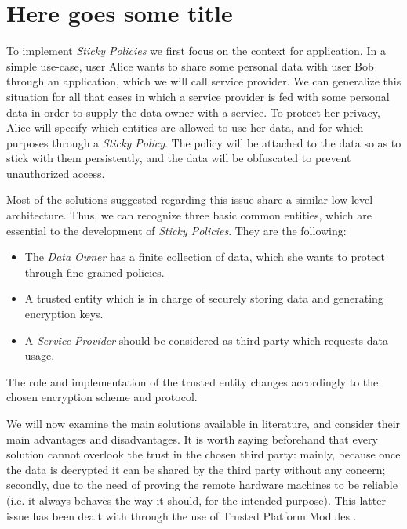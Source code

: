 \chapter{Here goes some title}
\label{chapter2}
\thispagestyle{empty}

To implement \textit{Sticky Policies} we first focus on the context for application. In a simple use-case, user Alice wants to share some personal data with user Bob through an application, which we will call service provider. We can generalize this situation for all that cases in which a service provider is fed with some personal data in order to supply the data owner with a service. To protect her privacy, Alice will specify which entities are allowed to use her data, and for which purposes through a \textit{Sticky Policy}. The policy will be attached to the data so as to stick with them persistently, and the data will be obfuscated to prevent unauthorized access.

Most of the solutions suggested regarding this issue share a similar low-level architecture. Thus, we can recognize three basic common entities, which are essential to the development of \textit{Sticky Policies}. They are the following: 
 \begin{itemize}
 	\item The \textit{Data Owner} has a finite collection of data, which she wants to protect through fine-grained policies.
 	\item A trusted entity which is in charge of securely storing data and generating encryption keys.
 	\item A \textit{Service Provider} should be considered as third party which requests data usage.
 \end{itemize}
The role and implementation of the trusted entity changes accordingly to the chosen encryption scheme and protocol.

We will now examine the main solutions available in literature, and consider their main advantages and disadvantages. It is worth saying beforehand that every solution cannot overlook the trust in the chosen third party: mainly, because once the data is decrypted it can be shared by the third party without any concern; secondly, due to the need of proving the remote hardware machines to be reliable (i.e. it always behaves the way it should, for the intended purpose). This latter issue has been dealt with through the use of Trusted Platform Modules \cite{standard2009trusted}.

